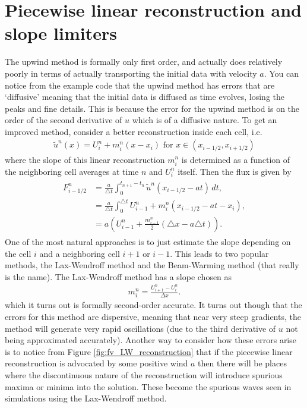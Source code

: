 \section*{Piecewise linear reconstruction and slope limiters}
The upwind method is formally only first order, and actually does relatively poorly in terms of actually transporting the initial data with velocity $a$.
You can notice from the example code that the upwind method has errors that are `diffusive' meaning that the initial data is diffused as time evolves, losing the peaks and fine details.
This is because the error for the upwind method is on the order of the second derivative of $u$ which is of a diffusive nature.
To get an improved method, consider a better reconstruction inside each cell, i.e.
\begin{gather}
\tilde{u}^n(x) = U_i^n + m_i^n(x-x_i) \mbox{ for } x \in (x_{i-1/2},x_{i+1/2})
\end{gather}
where the slope of this linear reconstruction $m_i^n$ is determined as a function of the neighboring cell averages at time $n$ and $U_i^n$ itself.
Then the flux is given by
\begin{align}
\begin{split}
F_{i-1/2}^n
&= \frac{a}{\triangle t}\int_{0}^{t_{n+1}-t_n} \tilde{u}^n(x_{i-1/2}-at)\, dt  ,\\
&= \frac{a}{\triangle t}\int_{0}^{\triangle t} U_{i-1}^n + m_i^n(x_{i-1/2} - at - x_i), \\
&= a \left( U_{i-1}^n + \frac{m_{i-1}^n}{2} (\triangle x - a \triangle t)\right).
\end{split}
\label{eqn:finite_volume_improved_flux}
\end{align}
One of the most natural approaches is to just estimate the slope depending on the cell $i$ and a neighboring cell $i+1$ or $i-1$.
This leads to two popular methods, the Lax-Wendroff method and the Beam-Warming method (that really is the name).
The Lax-Wendroff method has a slope chosen as
\begin{gather}
m_i^n = \frac{U^n_{i+1}-U_{i}^n}{\Delta x}.
\end{gather}
which it turns out is formally second-order accurate.
It turns out though that the errors for this method are dispersive, meaning that near very steep gradients, the method will generate very rapid oscillations (due to the third derivative of $u$ not being approximated accurately).
Another way to consider how these errors arise is to notice from Figure \ref{fig:fv_LW_reconstruction} that if the piecewise linear reconstruction is advocated by some positive wind $a$ then there will be places where the discontinuous nature of the reconstruction will introduce spurious maxima or minima into the solution.
These become the spurious waves seen in simulations using the Lax-Wendroff method.

